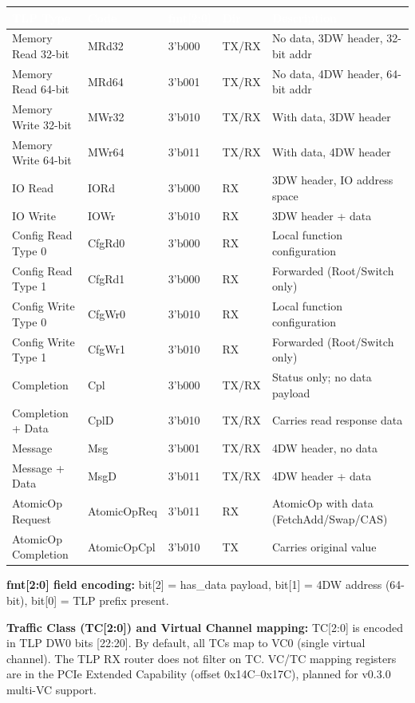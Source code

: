 \documentclass[11pt,a4paper]{article}
\newcommand{\theadcell}[1]{%
  \cellcolor{tablehead}\textcolor{white}{\textbf{#1}}}
\begin{document}
\begin{tabular}{llllp{5cm}}
  \toprule
  \theadcell{TLP Type} & \theadcell{Code} & \theadcell{fmt[2:0]} & \theadcell{Dir} & \theadcell{Description} \\
  \midrule
  Memory Read 32-bit    & MRd32    & 3'b000 & TX/RX & No data, 3DW header, 32-bit addr \\
  Memory Read 64-bit    & MRd64    & 3'b001 & TX/RX & No data, 4DW header, 64-bit addr \\
  Memory Write 32-bit   & MWr32    & 3'b010 & TX/RX & With data, 3DW header \\
  Memory Write 64-bit   & MWr64    & 3'b011 & TX/RX & With data, 4DW header \\
  IO Read               & IORd     & 3'b000 & RX    & 3DW header, IO address space \\
  IO Write              & IOWr     & 3'b010 & RX    & 3DW header + data \\
  Config Read Type 0    & CfgRd0   & 3'b000 & RX    & Local function configuration \\
  Config Read Type 1    & CfgRd1   & 3'b000 & RX    & Forwarded (Root/Switch only) \\
  Config Write Type 0   & CfgWr0   & 3'b010 & RX    & Local function configuration \\
  Config Write Type 1   & CfgWr1   & 3'b010 & RX    & Forwarded (Root/Switch only) \\
  Completion            & Cpl      & 3'b000 & TX/RX & Status only; no data payload \\
  Completion + Data     & CplD     & 3'b010 & TX/RX & Carries read response data \\
  Message               & Msg      & 3'b001 & TX/RX & 4DW header, no data \\
  Message + Data        & MsgD     & 3'b011 & TX/RX & 4DW header + data \\
  AtomicOp Request      & AtomicOpReq & 3'b011 & RX & AtomicOp with data (FetchAdd/Swap/CAS) \\
  AtomicOp Completion   & AtomicOpCpl & 3'b010 & TX & Carries original value \\
  \bottomrule
\end{tabular}

\vspace{2mm}
\noindent\textbf{fmt[2:0] field encoding:} bit[2] = has\_data payload, bit[1] = 4DW address (64-bit), bit[0] = TLP prefix present.

\vspace{2mm}
\noindent\textbf{Traffic Class (TC[2:0]) and Virtual Channel mapping:}
TC[2:0] is encoded in TLP DW0 bits [22:20]. By default, all TCs map to VC0
(single virtual channel). The TLP RX router does not filter on TC.
VC/TC mapping registers are in the PCIe Extended Capability (offset 0x14C--0x17C),
planned for v0.3.0 multi-VC support.
\end{document}
